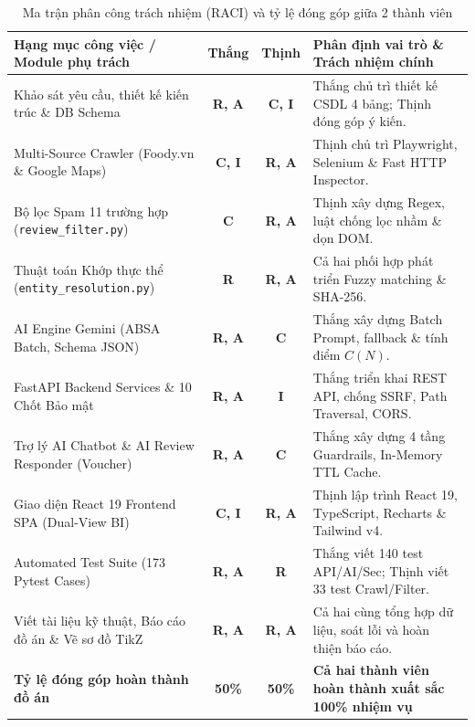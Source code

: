 \begin{table}[H]
\centering
\caption{Ma trận phân công trách nhiệm (RACI) và tỷ lệ đóng góp giữa 2 thành viên}
\label{tab:raci_matrix}
\vspace{0.15cm}
\footnotesize
\begin{tabularx}{\textwidth}{l c c X}
\toprule
\rowcolor{blue!8}
\textbf{Hạng mục công việc / Module phụ trách} & \textbf{Thắng} & \textbf{Thịnh} & \textbf{Phân định vai trò \& Trách nhiệm chính} \\
\midrule
Khảo sát yêu cầu, thiết kế kiến trúc \& DB Schema & \textbf{R, A} & \textbf{C, I} & Thắng chủ trì thiết kế CSDL 4 bảng; Thịnh đóng góp ý kiến. \\
Multi-Source Crawler (Foody.vn \& Google Maps) & \textbf{C, I} & \textbf{R, A} & Thịnh chủ trì Playwright, Selenium \& Fast HTTP Inspector. \\
Bộ lọc Spam 11 trường hợp (\texttt{review\_filter.py}) & \textbf{C} & \textbf{R, A} & Thịnh xây dựng Regex, luật chống lọc nhầm \& dọn DOM. \\
Thuật toán Khớp thực thể (\texttt{entity\_resolution.py}) & \textbf{R} & \textbf{R, A} & Cả hai phối hợp phát triển Fuzzy matching \& SHA-256. \\
AI Engine Gemini (ABSA Batch, Schema JSON) & \textbf{R, A} & \textbf{C} & Thắng xây dựng Batch Prompt, fallback \& tính điểm $C(N)$. \\
FastAPI Backend Services \& 10 Chốt Bảo mật & \textbf{R, A} & \textbf{I} & Thắng triển khai REST API, chống SSRF, Path Traversal, CORS. \\
Trợ lý AI Chatbot \& AI Review Responder (Voucher) & \textbf{R, A} & \textbf{C} & Thắng xây dựng 4 tầng Guardrails, In-Memory TTL Cache. \\
Giao diện React 19 Frontend SPA (Dual-View BI) & \textbf{C, I} & \textbf{R, A} & Thịnh lập trình React 19, TypeScript, Recharts \& Tailwind v4. \\
Automated Test Suite (173 Pytest Cases) & \textbf{R, A} & \textbf{R} & Thắng viết 140 test API/AI/Sec; Thịnh viết 33 test Crawl/Filter. \\
Viết tài liệu kỹ thuật, Báo cáo đồ án \& Vẽ sơ đồ TikZ & \textbf{R, A} & \textbf{R, A} & Cả hai cùng tổng hợp dữ liệu, soát lỗi và hoàn thiện báo cáo. \\
\midrule
\rowcolor{blue!8}
\textbf{Tỷ lệ đóng góp hoàn thành đồ án} & \textbf{50\%} & \textbf{50\%} & \textbf{Cả hai thành viên hoàn thành xuất sắc 100\% nhiệm vụ} \\
\bottomrule
\end{tabularx}
\end{table}
